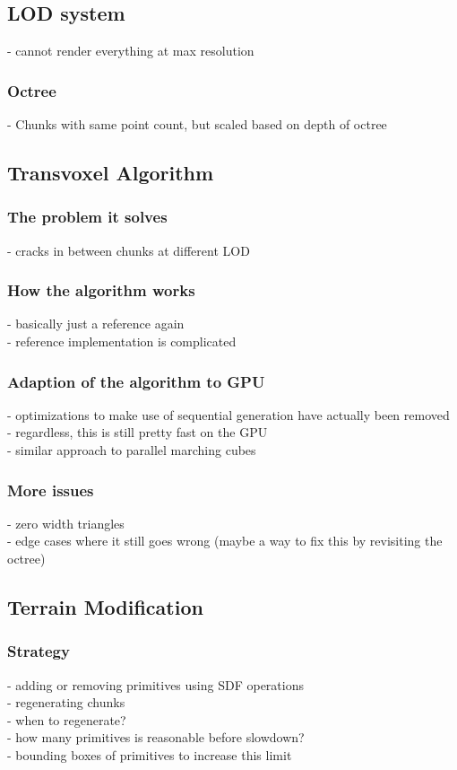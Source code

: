 \documentclass{article}
\begin{document}
\subsection{LOD system}
 - cannot render everything at max resolution
\subsubsection{Octree}
 - Chunks with same point count, but scaled based on depth of octree

\subsection{Transvoxel Algorithm}
\subsubsection{The problem it solves}
 - cracks in between chunks at different LOD
\subsubsection{How the algorithm works}
 - basically just a reference again\\
 - reference implementation is complicated
\subsubsection{Adaption of the algorithm to GPU}
 - optimizations to make use of sequential generation have actually been removed\\
 - regardless, this is still pretty fast on the GPU\\
 - similar approach to parallel marching cubes\\
\subsubsection{More issues}
- zero width triangles\\
- edge cases where it still goes wrong (maybe a way to fix this by revisiting the octree)\\

\subsection{Terrain Modification}
\subsubsection{Strategy}
 - adding or removing primitives using SDF operations\\
 - regenerating chunks\\
 - when to regenerate?\\
 - how many primitives is reasonable before slowdown?\\
 - bounding boxes of primitives to increase this limit\\
 
\end{document}
